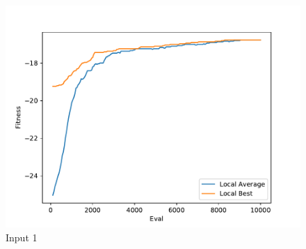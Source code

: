 \documentclass{standalone}
\begin{document}
\begin{figure}[!htb]
	\caption{Input 1}
	\label{fig:graph_1052}
	\includegraphics[width=\textwidth]{../graphs/graphs/1052.pdf}
\end{figure}
\end{document}
